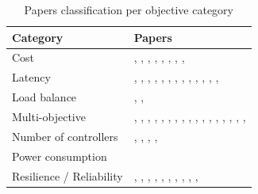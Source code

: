 \documentclass{IEEEtran}
\begin{document}
\begin{table}[!h]
    \centering
    \begin{tabular}{l p{5 cm} }
    
  \hline
Category  & Papers        \\  \hline
Cost                     & \cite{11-BaRo13}, \cite{HeBa17}, \cite{RaRe14}, \cite{RoRu14}, \cite{SaHi17}, \cite{SuHa17}, \cite{WuCh18}, \cite{YaHo15}, \cite{ZhWu17}                                                                                                                                       \\
Latency                  & \cite{AlAy17}, \cite{ChCh18}, \cite{GaWa15}, \cite{HeSh12}, \cite{HuLu16}, \cite{KiRa16}, \cite{KiRe18}, \cite{KsBa16}, \cite{MoNa18}, \cite{SaSa16}, \cite{SaSa17}, \cite{WaZh17}, \cite{XiQu14}, \cite{YaBi14}                                                               \\
Load balance             & \cite{HuJo15}, \cite{LiYo16}, \cite{WoLi15}                                                                                                                                                                               \\
Multi-objective          & \cite{AhJa15}, \cite{GoGi17}, \cite{HoHa13}, \cite{JaKe18}, \cite{JiCe14}, \cite{KhAh18}, \cite{KsBa16b}, \cite{KuYi18}, \cite{LaGe15}, \cite{LaGeb15}, \cite{PeRe16}, \cite{TaMo18}, \cite{TaYi18}, \cite{TiZh18}, \cite{VaMo18}, \cite{VoBo15}, \cite{ZhGi17}, \cite{ZhWa18} \\
Number of controllers    & \cite{23-LiWa15}, \cite{26-ChWa15}, \cite{AbMa17}, \cite{SuMa18}, \cite{TaSa18}                                                                          \\
Power consumption        & \cite{HuLu17}                                                                                                                                                       \\
Resilience / Reliability & \cite{FaXi18}, \cite{HuWa12-1}, \cite{LiJia16}, \cite{LiSh18}, \cite{MaDu16}, \cite{MaJe18}, \cite{MuOl14}, \cite{SaSo18}, \cite{VaPo17}, \cite{ViMa16}, \cite{ZhBe11} \\ \hline                                                 
\end{tabular}
    \caption{Papers classification per objective category}
    \label{tab:category}
\end{table}
\end{document}
